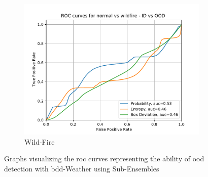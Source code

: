 \begin{figure}[ht]
    	\begin{center}
    	\begin{subfigure}[t]{0.495\textwidth}
    		\centering
    		\includegraphics[width=\textwidth]{images/weather_roc/normal vs wildfire_ROC_Score_using_subens.pdf}
    		\caption{Wild-Fire}
    	\end{subfigure}
    	\end{center}
    	\caption[ROC curves of weather \acrshort{ood} detection using Sub-Ensembles]{Graphs visualizing the \acrshort{roc} curves representing the ability of \acrshort{ood} detection with \acrshort{bdd}-Weather using Sub-Ensembles}
    	\label{uq_weather_roc_curves}
    \end{figure}
    
